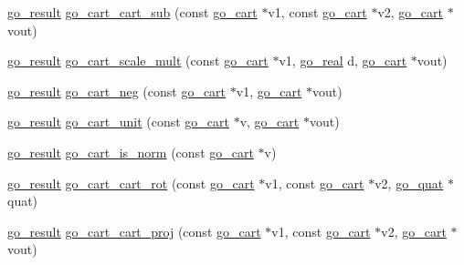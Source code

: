 \begin{DoxyCompactItemize}
\item 
\hyperlink{gotypes_8h_a55d48b38cd959f63c7e8db8337a9792a}{go\-\_\-result} \hyperlink{namespacegomotion_a967e5544042ebcc17f55e15d406d703c}{go\-\_\-cart\-\_\-cart\-\_\-sub} (const \hyperlink{structgomotion_1_1go__cart}{go\-\_\-cart} $\ast$v1, const \hyperlink{structgomotion_1_1go__cart}{go\-\_\-cart} $\ast$v2, \hyperlink{structgomotion_1_1go__cart}{go\-\_\-cart} $\ast$vout)
\item 
\hyperlink{gotypes_8h_a55d48b38cd959f63c7e8db8337a9792a}{go\-\_\-result} \hyperlink{namespacegomotion_ae93c6dcde94e08e775a1ef34d0b2b2bc}{go\-\_\-cart\-\_\-scale\-\_\-mult} (const \hyperlink{structgomotion_1_1go__cart}{go\-\_\-cart} $\ast$v1, \hyperlink{gotypes_8h_afd666a2393eebd71ee455846ac9def9b}{go\-\_\-real} d, \hyperlink{structgomotion_1_1go__cart}{go\-\_\-cart} $\ast$vout)
\item 
\hyperlink{gotypes_8h_a55d48b38cd959f63c7e8db8337a9792a}{go\-\_\-result} \hyperlink{namespacegomotion_a8180073b70336b3d2d4191502b443eeb}{go\-\_\-cart\-\_\-neg} (const \hyperlink{structgomotion_1_1go__cart}{go\-\_\-cart} $\ast$v1, \hyperlink{structgomotion_1_1go__cart}{go\-\_\-cart} $\ast$vout)
\item 
\hyperlink{gotypes_8h_a55d48b38cd959f63c7e8db8337a9792a}{go\-\_\-result} \hyperlink{namespacegomotion_abca14b53436057a03c29ca458e8850c1}{go\-\_\-cart\-\_\-unit} (const \hyperlink{structgomotion_1_1go__cart}{go\-\_\-cart} $\ast$v, \hyperlink{structgomotion_1_1go__cart}{go\-\_\-cart} $\ast$vout)
\item 
\hyperlink{gotypes_8h_a55d48b38cd959f63c7e8db8337a9792a}{go\-\_\-result} \hyperlink{namespacegomotion_a32d016105eb4aa2e32bd75373002378f}{go\-\_\-cart\-\_\-is\-\_\-norm} (const \hyperlink{structgomotion_1_1go__cart}{go\-\_\-cart} $\ast$v)
\item 
\hyperlink{gotypes_8h_a55d48b38cd959f63c7e8db8337a9792a}{go\-\_\-result} \hyperlink{namespacegomotion_a28374e45a3f7ec79b8ca7b84efe6617d}{go\-\_\-cart\-\_\-cart\-\_\-rot} (const \hyperlink{structgomotion_1_1go__cart}{go\-\_\-cart} $\ast$v1, const \hyperlink{structgomotion_1_1go__cart}{go\-\_\-cart} $\ast$v2, \hyperlink{structgomotion_1_1go__quat}{go\-\_\-quat} $\ast$quat)
\item 
\hyperlink{gotypes_8h_a55d48b38cd959f63c7e8db8337a9792a}{go\-\_\-result} \hyperlink{namespacegomotion_a1645b058c53e30ced09d3a3823d2f75e}{go\-\_\-cart\-\_\-cart\-\_\-proj} (const \hyperlink{structgomotion_1_1go__cart}{go\-\_\-cart} $\ast$v1, const \hyperlink{structgomotion_1_1go__cart}{go\-\_\-cart} $\ast$v2, \hyperlink{structgomotion_1_1go__cart}{go\-\_\-cart} $\ast$vout)

\end{DoxyCompactItemize}
